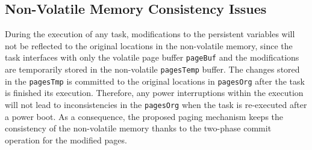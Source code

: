 \subsection{Non-Volatile Memory Consistency Issues}  
During the execution of any task, modifications to the persistent variables will not be reflected to the original locations in the non-volatile memory, since the task interfaces with only the volatile page buffer \texttt{pageBuf} and the modifications are temporarily stored in the non-volatile \texttt{pagesTemp} buffer. The changes stored in the \texttt{pagesTmp} is committed to the original locations in \texttt{pagesOrg} after the task is finished its execution. Therefore, any power interruptions within the execution will not lead to inconsistencies in the \texttt{pagesOrg} when the task is re-executed after a power boot. As a consequence, the proposed paging mechanism keeps the consistency of the non-volatile memory thanks to the two-phase commit operation for the modified pages. 
